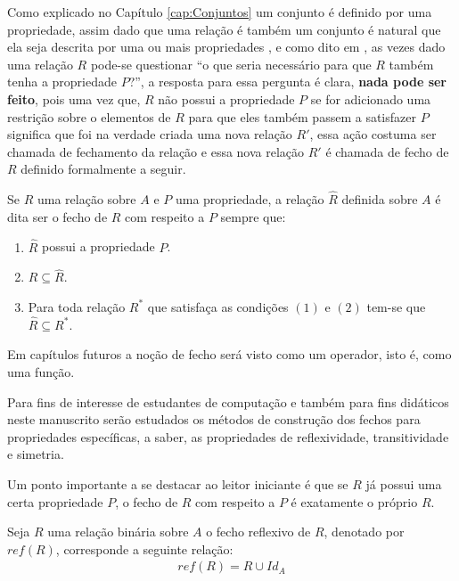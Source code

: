 Como explicado no Capítulo \ref{cap:Conjuntos} um conjunto é definido por uma propriedade, assim dado que uma relação é também um conjunto é natural que ela seja descrita por uma ou mais propriedades , e como dito em \cite{judith2021}, as vezes dado uma relação $R$ pode-se questionar ``o que seria necessário para que  $R$ também tenha a propriedade  $P$?'', a resposta para essa pergunta é clara, \textbf{nada pode ser feito}, pois uma vez que, $R$ não possui a propriedade $P$ se for adicionado uma restrição sobre o elementos de $R$ para que eles também passem a satisfazer $P$ significa que foi na verdade criada uma nova relação $R'$, essa ação costuma ser chamada de fechamento da relação e essa nova relação $R'$ é chamada de fecho de $R$ definido formalmente a seguir.

\begin{definition}
	Se $R$ uma relação sobre $A$ e $P$ uma propriedade, a relação $\widehat{R}$ definida sobre $A$ é dita ser o fecho de $R$ com respeito a $P$ sempre que:
	\begin{enumerate}
		\item $\widehat{R}$ possui a propriedade $P$.
		\item $R \subseteq \widehat{R}$.
		\item Para toda relação $R^*$ que satisfaça as condições $(1)$ e $(2)$ tem-se que $\widehat{R} \subseteq R^*$. 
	\end{enumerate}
\end{definition}

\begin{remark}
	Em capítulos futuros a noção de fecho será visto como um operador, isto é, como uma função.
\end{remark}

Para fins de interesse de estudantes de computação e também para fins didáticos neste manuscrito serão estudados os métodos de construção dos fechos para propriedades específicas, a saber, as propriedades de reflexividade, transitividade e simetria.

Um ponto importante a se destacar ao leitor iniciante é que se $R$ já possui uma certa propriedade $P$, o fecho de $R$ com respeito a $P$ é exatamente o próprio $R$.

\begin{definition}\label{def:FechoReflexivo}
	Seja $R$ uma relação binária sobre $A$ o fecho reflexivo de $R$, denotado por $ref(R)$, corresponde a seguinte relação:
	\begin{eqnarray*}
		ref(R) = R \cup Id_A
	\end{eqnarray*}
\end{definition}

